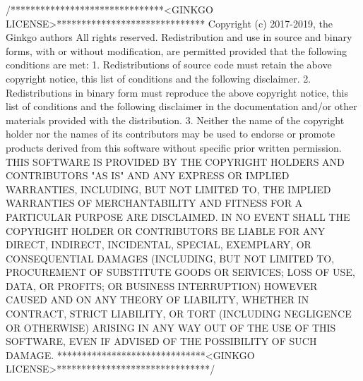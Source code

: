 {\ttfamily  
\begin{DoxyCodeInclude}
\textcolor{comment}{/*******************************<GINKGO LICENSE>******************************}
\textcolor{comment}{Copyright (c) 2017-2019, the Ginkgo authors}
\textcolor{comment}{All rights reserved.}
\textcolor{comment}{}
\textcolor{comment}{Redistribution and use in source and binary forms, with or without}
\textcolor{comment}{modification, are permitted provided that the following conditions}
\textcolor{comment}{are met:}
\textcolor{comment}{}
\textcolor{comment}{1. Redistributions of source code must retain the above copyright}
\textcolor{comment}{notice, this list of conditions and the following disclaimer.}
\textcolor{comment}{}
\textcolor{comment}{2. Redistributions in binary form must reproduce the above copyright}
\textcolor{comment}{notice, this list of conditions and the following disclaimer in the}
\textcolor{comment}{documentation and/or other materials provided with the distribution.}
\textcolor{comment}{}
\textcolor{comment}{3. Neither the name of the copyright holder nor the names of its}
\textcolor{comment}{contributors may be used to endorse or promote products derived from}
\textcolor{comment}{this software without specific prior written permission.}
\textcolor{comment}{}
\textcolor{comment}{THIS SOFTWARE IS PROVIDED BY THE COPYRIGHT HOLDERS AND CONTRIBUTORS "AS}
\textcolor{comment}{IS" AND ANY EXPRESS OR IMPLIED WARRANTIES, INCLUDING, BUT NOT LIMITED}
\textcolor{comment}{TO, THE IMPLIED WARRANTIES OF MERCHANTABILITY AND FITNESS FOR A}
\textcolor{comment}{PARTICULAR PURPOSE ARE DISCLAIMED. IN NO EVENT SHALL THE COPYRIGHT}
\textcolor{comment}{HOLDER OR CONTRIBUTORS BE LIABLE FOR ANY DIRECT, INDIRECT, INCIDENTAL,}
\textcolor{comment}{SPECIAL, EXEMPLARY, OR CONSEQUENTIAL DAMAGES (INCLUDING, BUT NOT}
\textcolor{comment}{LIMITED TO, PROCUREMENT OF SUBSTITUTE GOODS OR SERVICES; LOSS OF USE,}
\textcolor{comment}{DATA, OR PROFITS; OR BUSINESS INTERRUPTION) HOWEVER CAUSED AND ON ANY}
\textcolor{comment}{THEORY OF LIABILITY, WHETHER IN CONTRACT, STRICT LIABILITY, OR TORT}
\textcolor{comment}{(INCLUDING NEGLIGENCE OR OTHERWISE) ARISING IN ANY WAY OUT OF THE USE}
\textcolor{comment}{OF THIS SOFTWARE, EVEN IF ADVISED OF THE POSSIBILITY OF SUCH DAMAGE.}
\textcolor{comment}{******************************<GINKGO LICENSE>*******************************/}


\end{DoxyCodeInclude}}
